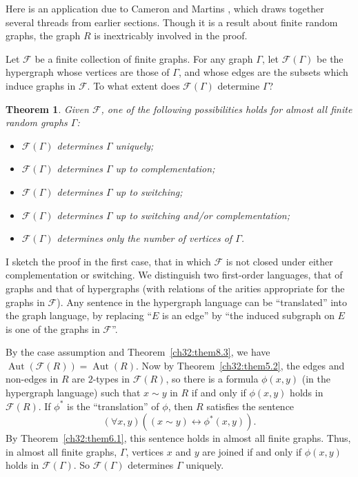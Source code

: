 \documentclass[12pt]{article}
\newtheorem{theorem}{Theorem}
\DeclareMathOperator{\Aut}{Aut}
\begin{document}
Here is an application due to Cameron and Martins
\cite{ch32:bib10}, which draws together several threads from earlier
sections. Though it is a result about finite random graphs, the
graph $R$ is inextricably involved in the proof.

Let $\mathcal{F}$ be a finite collection of finite graphs. For any
graph $\Gamma$, let $\mathcal{F}(\Gamma)$ be the hypergraph whose
vertices are those of $\Gamma$, and whose edges are the subsets
which induce graphs in $\mathcal{F}$. To what extent does
$\mathcal{F}(\Gamma)$ determine $\Gamma$?

\begin{theorem}\label{ch32:them8.4} 
Given $\mathcal{F}$, one of the following
possibilities holds for almost all finite random graphs $\Gamma$:
\begin{itemize}
\item[(a)] $\mathcal{F}(\Gamma)$ determines $\Gamma$ uniquely;
\item[(b)] $\mathcal{F}(\Gamma)$ determines $\Gamma$ up to complementation;
\item[(c)] $\mathcal{F}(\Gamma)$ determines $\Gamma$ up to switching;
\item[(d)] $\mathcal{F}(\Gamma)$ determines $\Gamma$ up to switching and/or complementation;
\item[(e)] $\mathcal{F}(\Gamma)$ determines only the number of vertices of $\Gamma$.
\end{itemize}
\end{theorem}

I sketch the proof in the first case, that in which $\mathcal{F}$ is
not closed under either complementation or switching. We distinguish
two first-order languages, that of graphs and that of hypergraphs
(with relations of the arities appropriate for the graphs in
$\mathcal{F}$). Any sentence in the hypergraph language can be
``translated'' into the graph language, by replacing ``$E$ is an
edge'' by ``the induced subgraph on $E$ is one of the graphs in
$\mathcal{F}$''.

By the case assumption and Theorem~\ref{ch32:them8.3}, we have
$\Aut(\mathcal{F}(R)) = \Aut(R)$. Now by
Theorem~\ref{ch32:them5.2}, the edges and non-edges in $R$ are
$2$-types in $\mathcal{F}(R)$, so there is a formula $\phi(x, y)$ (in
the hypergraph language) such that $x \sim y$ in $R$ if and only if
$\phi(x, y)$ holds in $\mathcal{F}(R)$. If $\phi^{\ast}$ is the
``translation'' of $\phi$, then $R$ satisfies the sentence
\[
(\forall x, y)((x \sim y) \leftrightarrow \phi^{\ast}(x, y)).
\]
By Theorem~\ref{ch32:them6.1}, this sentence holds in almost all
finite graphs. Thus, in almost all finite graphs, $\Gamma$, vertices
$x$ and $y$ are joined if and only if $\phi(x, y)$ holds in
$\mathcal{F}(\Gamma)$. So $\mathcal{F}(\Gamma)$ determines $\Gamma$
uniquely.
\end{document}
